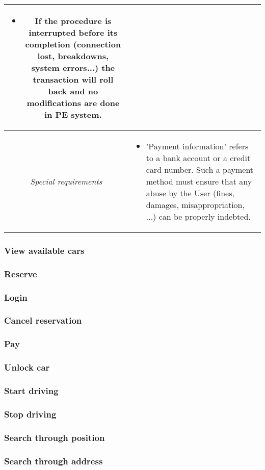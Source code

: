 \begin{center}
\begin{tabular}{c | p{} }
\begin{itemize}
			\item If the procedure is interrupted before its completion (connection lost, breakdowns, system errors...) the transaction will roll back and no modifications are done in PE system.
		\end{itemize} \\
		\hline
		\textit{Special requirements} &  
			\begin{itemize}
				\item 'Payment information' refers to a bank account or a credit card number. Such a payment method must ensure that any abuse by the User (fines, damages, misappropriation, ...) can be properly indebted.
			\end{itemize} \\ 
		\hline
	\end{tabular}
\end{center}

\subsubsection{View available cars}
\subsubsection{Reserve}
\subsubsection{Login}
\subsubsection{Cancel reservation}
\subsubsection{Pay}
\subsubsection{Unlock car}
\subsubsection{Start driving}
\subsubsection{Stop driving}
\subsubsection{Search through position}
\subsubsection{Search through address}